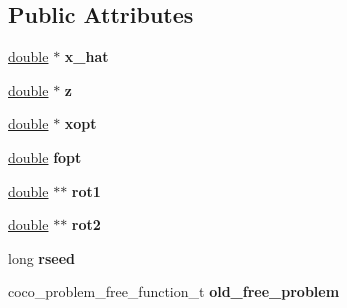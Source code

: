 \subsection*{Public Attributes}
\begin{DoxyCompactItemize}
\item 
\hyperlink{classdouble}{double} $\ast$ {\bfseries x\+\_\+hat}\hypertarget{structf__lunacek__bi__rastrigin__data__t_a44a819e7f2a0d8b529ccdecbf025bdf6}{}\label{structf__lunacek__bi__rastrigin__data__t_a44a819e7f2a0d8b529ccdecbf025bdf6}

\item 
\hyperlink{classdouble}{double} $\ast$ {\bfseries z}\hypertarget{structf__lunacek__bi__rastrigin__data__t_a7adf5e06bb83decbee671a9f6d6f96ea}{}\label{structf__lunacek__bi__rastrigin__data__t_a7adf5e06bb83decbee671a9f6d6f96ea}

\item 
\hyperlink{classdouble}{double} $\ast$ {\bfseries xopt}\hypertarget{structf__lunacek__bi__rastrigin__data__t_a5baf5bdf0feba46c15407b3e73f0e792}{}\label{structf__lunacek__bi__rastrigin__data__t_a5baf5bdf0feba46c15407b3e73f0e792}

\item 
\hyperlink{classdouble}{double} {\bfseries fopt}\hypertarget{structf__lunacek__bi__rastrigin__data__t_a5e4ded9d0e1bb111ae0b39550060194a}{}\label{structf__lunacek__bi__rastrigin__data__t_a5e4ded9d0e1bb111ae0b39550060194a}

\item 
\hyperlink{classdouble}{double} $\ast$$\ast$ {\bfseries rot1}\hypertarget{structf__lunacek__bi__rastrigin__data__t_a207fa91b0a539bc883274542c3227ed8}{}\label{structf__lunacek__bi__rastrigin__data__t_a207fa91b0a539bc883274542c3227ed8}

\item 
\hyperlink{classdouble}{double} $\ast$$\ast$ {\bfseries rot2}\hypertarget{structf__lunacek__bi__rastrigin__data__t_a035bd57b1a801de05047197df902b2ac}{}\label{structf__lunacek__bi__rastrigin__data__t_a035bd57b1a801de05047197df902b2ac}

\item 
long {\bfseries rseed}\hypertarget{structf__lunacek__bi__rastrigin__data__t_a314c321f13967bb5187f061f2594e94a}{}\label{structf__lunacek__bi__rastrigin__data__t_a314c321f13967bb5187f061f2594e94a}

\item 
coco\+\_\+problem\+\_\+free\+\_\+function\+\_\+t {\bfseries old\+\_\+free\+\_\+problem}\hypertarget{structf__lunacek__bi__rastrigin__data__t_a231542609290e5d1f1cd7ecd056a62f7}{}\label{structf__lunacek__bi__rastrigin__data__t_a231542609290e5d1f1cd7ecd056a62f7}

\end{DoxyCompactItemize}


